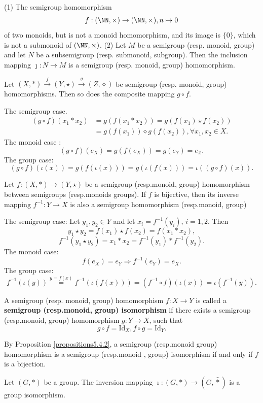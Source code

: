 \begin{remark}
    \quad
    \newline
    (1) The semigroup homomorphism
    $$f:(\NN, \times)\rightarrow (\NN, \times), n\mapsto 0$$
    of two monoids, but is not a monoid homomorphism, and its image is $\{0\}$,  which is not a submonoid of $(\NN, \times)$.
    \newline
    (2) Let $M$ be a semigroup (resp. monoid, group) and let $N$ be a subsemigroup (resp. submonoid, subgroup). Then the inclusion mapping $\jmath :N\rightarrow M$ is a semigroup (resp. monoid,  group) homomorphism.
\end{remark}
\begin{propositionenv}\label{propositions5.4.2}
    Let $(X, *)\overset{f}{\rightarrow} (Y, \star)\overset{g}{\rightarrow}(Z, \diamond ) $ be semigroup (resp. monoid,  group) homomorphisms. Then so does the composite mapping $g\circ f$.
\end{propositionenv}
\begin{proofenv}
    The semigroup case.
        \begin{align*}
            (g\circ f)(x_1*x_2) & = g(f(x_1*x_2))  = g(f(x_1)\star f(x_2)) \\
            & = g(f(x_1))\diamond g(f(x_2)), \forall x_1, x_2\in X.
        \end{align*}
    The monoid case :
    $$(g\circ f)(e_X)=g(f(e_X))=g(e_Y)=e_Z.$$
    The group case:
    $$(g\circ f)(\iota(x))=g(f(\iota(x)))=g(\iota(f(x)))=\iota((g\circ f)(x)).$$
\end{proofenv}
\begin{propositionenv}
    Let $f:(X, *)\rightarrow (Y, \star)$ be a semigroup (resp.monoid,  group) homomorphism between semigroups (resp.monoids groups). If $f$ is bijective,  then its inverse mapping $f^{-1}:Y\rightarrow X$ is also a semigroup homomorphism (resp.monoid, group) 
\end{propositionenv}
\begin{proofenv}
    The semigroup case: Let $y_1, y_2\in Y$ and let $x_i=f^{-1}(y_i), \, i=1, 2$. Then 
    $$y_1\star y_2=f(x_1)\star f(x_2)=f(x_1*x_2), $$
    $$f^{-1}(y_1\star y_2)=x_1*x_2=f^{-1}(y_1)*f^{-1}(y_2).$$
    The monoid case:
    $$f(e_X)=e_Y\Rightarrow f^{-1}(e_Y)=e_X.$$
    The group case:
    $$f^{-1}(\iota(y))\overset{y=f(x)}{=}f^{-1}(\iota(f(x)))=(f^{-1}\circ f)(\iota(x))=\iota(f^{-1}(y)).$$
\end{proofenv}
\begin{definitionenv}
    A semigroup (resp. monoid,  group) homomorphism $f:X\rightarrow Y$ is called a \textbf{semigroup (resp.monoid, group) isomorphism} if there exists a semigroup (resp.monoid, group) homomorphism $g:Y\rightarrow X$,  such that 
    $$g\circ f=\mathrm{Id}_X, f\circ g=\mathrm{Id}_Y.$$
\end{definitionenv}
By Proposition \ref{propositions5.4.2},  a semigroup (resp.monoid group) homomorphism is a semigroup (resp.monoid , group) isomorphism if and only if $f$ is a bijection.
\begin{propositionenv}
    Let $(G, *)$ be a group. The inversion mapping $\imath :(G, *)\rightarrow(G, \hat{*})$ is a group isomorphism.
\end{propositionenv}
